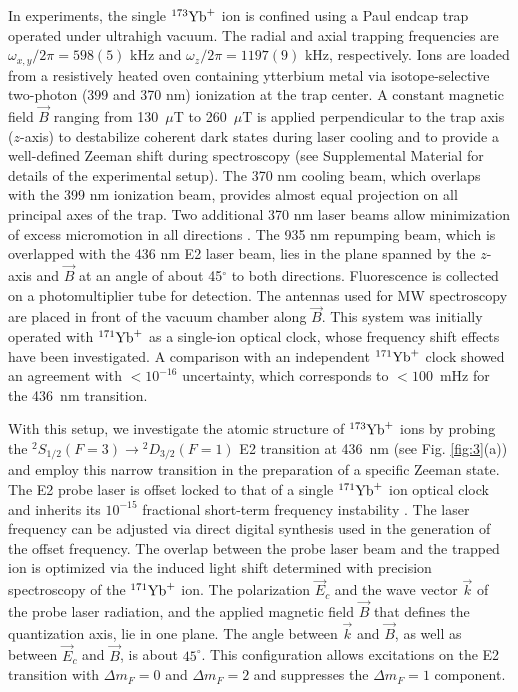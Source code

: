 \documentclass[
reprint,
superscriptaddress,









amsmath,amssymb,
aps,prl






]{revtex4-2}
\begin{document}
In experiments, the single $^{173}\rm{Yb}^+$ ion is confined using a Paul endcap trap \cite{abdelhafiz2019} operated under ultrahigh vacuum. The radial and axial trapping frequencies are $\omega_{x,y}/2\pi=598(5)$ kHz and $\omega_{z}/2\pi=1197(9)$ kHz, respectively. Ions are loaded from a resistively heated oven containing ytterbium metal via isotope-selective two-photon (399 and 370 nm) ionization \cite{Johaning2011} at the trap center.
A constant magnetic field $\vec{B}$ ranging from 130~$\mu$T to 260~$\mu$T is applied perpendicular to the trap axis ($z$-axis) to destabilize coherent dark states during laser cooling \cite{Berkeland2002} and to provide a well-defined Zeeman shift during spectroscopy (see Supplemental Material \cite{appendixA} for details of the experimental setup).
The 370 nm cooling beam, which overlaps with the 399 nm ionization beam, provides almost equal projection on all principal axes of the trap. Two additional 370 nm laser beams allow minimization of excess micromotion in all directions \cite{Keller2015}.
The 935 nm repumping beam, which is overlapped with the 436 nm E2 laser beam, lies in the plane spanned by the $z$-axis and $\vec{B}$ at an angle of about 45$^{\circ}$ to both directions.
Fluorescence is collected on a photomultiplier tube for detection. The antennas used for MW spectroscopy are placed in front of the vacuum chamber along $\vec{B}$.
This system was initially operated with $^{171}\rm{Yb}^+$ as a single-ion optical clock, whose frequency shift effects have been investigated. A comparison with an independent $^{171}\rm{Yb}^+$ clock \cite{Huntemann2016} showed an agreement with $<10^{-16}$ uncertainty, which corresponds to $<100$~mHz for the 436~nm transition.


With this setup, we investigate the atomic structure of $^{173}\rm{Yb}^+$ ions by probing the $^2\!S_{1/2}(F=3) \rightarrow {}^2\!D_{3/2}(F=1)$ E2 transition at 436~nm (see Fig. \ref{fig:3}(a)) and employ this narrow transition in the preparation of a specific Zeeman state.
The E2 probe laser is offset locked to that of a single $^{171}\rm{Yb}^+$ ion optical clock and inherits its $10^{-15}$ fractional short-term frequency instability \cite{Tamm2014, Huntemann2016}.
The laser frequency can be adjusted via direct digital synthesis used in the generation of the offset frequency.
The overlap between the probe laser beam and the trapped ion is optimized via the induced light shift determined with precision spectroscopy of the $^{171}\rm{Yb}^+$ ion. The polarization $\vec{E}_c$ and the wave vector $\vec{k}$ of the probe laser radiation, and the applied magnetic field $\vec{B}$ that defines the quantization axis, lie in one plane. The angle between $\vec{k}$ and $\vec{B}$, as well as between $\vec{E}_c$ and $\vec{B}$, is about $45^{\circ}$. This configuration allows excitations on the E2 transition with $\Delta m_F=0$ and $\Delta m_F=2$ and suppresses the $\Delta m_F=1$ component.
\end{document}
